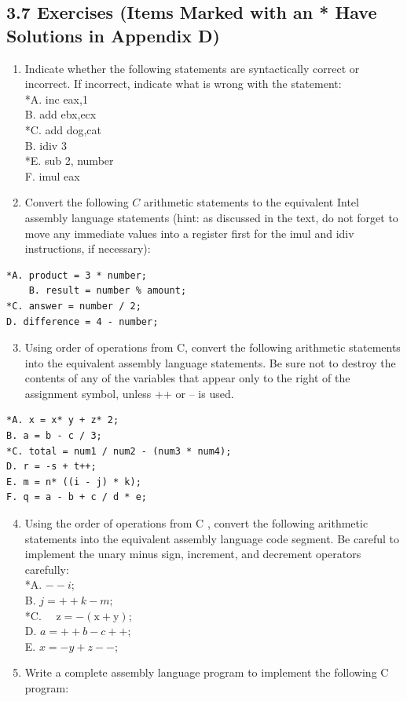 \documentclass[10pt]{book}
\begin{document}
\subsection*{3.7 Exercises (Items Marked with an * Have Solutions in Appendix D)}
\begin{enumerate}
  \item Indicate whether the following statements are syntactically correct or incorrect. If incorrect, indicate what is wrong with the statement:\\
*A. inc eax,1\\
B. add ebx,ecx\\
*C. add dog,cat\\
B. idiv 3\\
*E. sub 2, number\\
F. imul eax
  \item Convert the following $C$ arithmetic statements to the equivalent Intel assembly language statements (hint: as discussed in the text, do not forget to move any immediate values into a register first for the imul and idiv instructions, if necessary):
\end{enumerate}

\begin{verbatim}
*A. product = 3 * number;
    B. result = number % amount;
*C. answer = number / 2;
D. difference = 4 - number;
\end{verbatim}

\begin{enumerate}
  \setcounter{enumi}{2}
  \item Using order of operations from C, convert the following arithmetic statements into the equivalent assembly language statements. Be sure not to destroy the contents of any of the variables that appear only to the right of the assignment symbol, unless ++ or -- is used.
\end{enumerate}

\begin{verbatim}
*A. x = x* y + z* 2;
B. a = b - c / 3;
*C. total = num1 / num2 - (num3 * num4);
D. r = -s + t++;
E. m = n* ((i - j) * k);
F. q = a - b + c / d * e;
\end{verbatim}

\begin{enumerate}
  \setcounter{enumi}{3}
  \item Using the order of operations from C , convert the following arithmetic statements into the equivalent assembly language code segment. Be careful to implement the unary minus sign, increment, and decrement operators carefully:\\

*A. $--i$;\\
B. $j=++k-m ;$\\
*C. $\quad \mathrm{z}=-(\mathrm{x}+\mathrm{y})$;\\
D. $a=++b-c++;$\\
E. $x=-y+z--$;
  \item Write a complete assembly language program to implement the following C program:
\end{enumerate}
\end{document}
